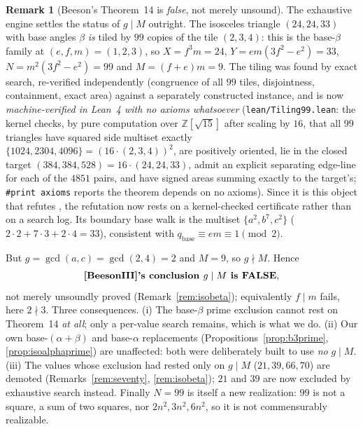 \documentclass[11pt,reqno]{amsart}
\theoremstyle{plain}
\theoremstyle{definition}
\newtheorem{remark}[theorem]{Remark}
\newcommand{\Z}{\mathbb{Z}}
\begin{document}
\begin{remark}[Beeson's Theorem~14 is \emph{false}, not merely unsound]\label{rem:thm14false}
The exhaustive engine settles the status of $g\mid M$ outright. The isosceles triangle
$(24,24,33)$ with base angles $\beta$ \emph{is} tiled by $99$ copies of the tile $(2,3,4)$: this is
the base-$\beta$ family at $(e,f,m)=(1,2,3)$, so $X=f^3m=24$, $Y=em(3f^2-e^2)=33$,
$N=m^2(3f^2-e^2)=99$ and $M=(f+e)m=9$. The tiling was found by exact search, re-verified
independently (congruence of all $99$ tiles, disjointness, containment, exact area) against a
separately constructed instance, and is now \emph{machine-verified in Lean~4 with no axioms
whatsoever} (\texttt{lean/Tiling99.lean}: the kernel checks, by pure computation over
$\Z[\sqrt{15}]$ after scaling by $16$, that all $99$ triangles have squared side multiset exactly
$\{1024,2304,4096\}=(16\cdot(2,3,4))^2$, are positively oriented, lie in the closed target
$(384,384,528)=16\cdot(24,24,33)$, admit an explicit separating edge-line for each of the $4851$
pairs, and have signed areas summing exactly to the target's; \texttt{\#print axioms} reports the
theorem depends on no axioms). Since it is this object that refutes \cite[Thm.~14]{BeesonIII},
the refutation now rests on a kernel-checked certificate rather than on a search log.
Its boundary base walk is the multiset $\{a^2,b^7,c^2\}$
($2\cdot2+7\cdot3+2\cdot4=33$), consistent with $q_{\mathrm{base}}\equiv em\equiv1 \pmod 2$.

But $g=\gcd(a,c)=\gcd(2,4)=2$ and $M=9$, so $g\nmid M$. Hence
\[
\textbf{\cite[Thm.~14]{BeesonIII}'s conclusion } g\mid M \textbf{ is FALSE},
\]
not merely unsoundly proved (Remark~\ref{rem:isobeta}); equivalently $f\mid m$ fails, here $2\nmid3$.
Three consequences. (i) The base-$\beta$ prime exclusion cannot rest on Theorem~14 \emph{at all};
only a per-value search remains, which is what we do. (ii) Our own base-$(\alpha{+}\beta)$ and
base-$\alpha$ replacements (Propositions~\ref{prop:b3prime}, \ref{prop:isoalphaprime}) are unaffected:
both were deliberately built to use \emph{no} $g\mid M$. (iii) The values whose exclusion had rested
only on $g\mid M$ ($21,39,66,70$) are demoted (Remarks~\ref{rem:seventy},
\ref{rem:isobeta}); $21$ and $39$ are now excluded by exhaustive search instead. Finally $N=99$ is itself a new realization: $99$
is not a square, a sum of two squares, nor $2n^2,3n^2,6n^2$, so it is not commensurably realizable.
\end{remark}
\end{document}
